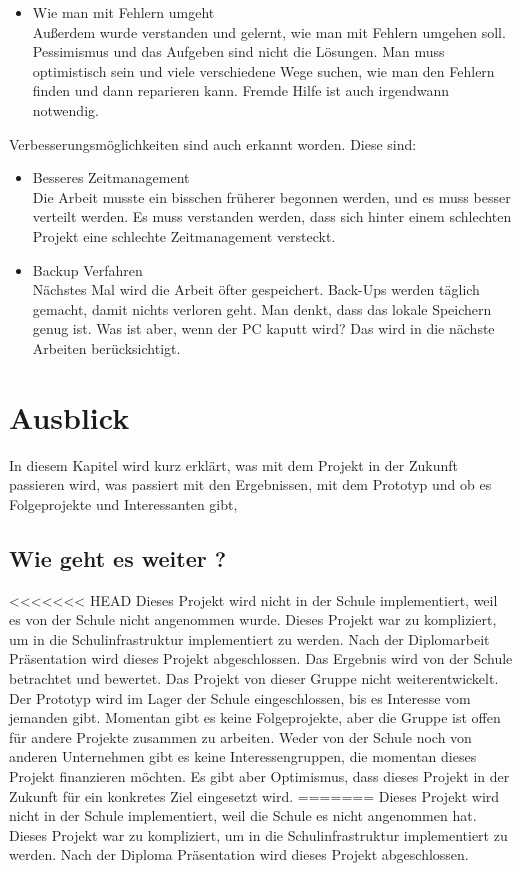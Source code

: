 \begin{itemize}
	\item Wie man mit Fehlern umgeht \\
	
	Außerdem wurde verstanden und gelernt, wie man mit Fehlern umgehen soll. Pessimismus und das Aufgeben sind nicht die Lösungen. Man muss optimistisch sein und viele verschiedene Wege suchen, wie man den Fehlern finden und dann reparieren kann. Fremde Hilfe ist auch irgendwann notwendig.
\end{itemize}	
	 Verbesserungsmöglichkeiten sind auch erkannt worden. Diese sind: 
\begin{itemize}	
	
	\item Besseres Zeitmanagement \\
	
	Die Arbeit musste ein bisschen früherer begonnen werden, und es muss besser verteilt werden. Es muss verstanden werden, dass sich hinter einem schlechten Projekt eine schlechte Zeitmanagement versteckt.
	
	\item Backup Verfahren \\
	
	Nächstes Mal wird die Arbeit öfter gespeichert. Back-Ups werden täglich gemacht, damit nichts verloren geht. Man denkt, dass das lokale Speichern genug ist. Was ist aber, wenn der PC kaputt wird? Das wird in die nächste Arbeiten berücksichtigt.
\end{itemize}

\chapter{Ausblick}
In diesem Kapitel wird kurz erkl\"art, was mit dem Projekt in der Zukunft passieren wird, was passiert mit den Ergebnissen, mit dem Prototyp und ob es Folgeprojekte und Interessanten gibt,
\section{Wie geht es weiter ?}
<<<<<<< HEAD
Dieses Projekt wird nicht in der Schule implementiert, weil es von der Schule nicht angenommen wurde. Dieses Projekt war zu kompliziert, um in die Schulinfrastruktur implementiert zu werden. Nach der Diplomarbeit Präsentation wird dieses Projekt abgeschlossen. Das Ergebnis wird von der Schule betrachtet und bewertet. Das Projekt von dieser Gruppe nicht weiterentwickelt. Der Prototyp wird im Lager der Schule eingeschlossen, bis es Interesse vom jemanden gibt. Momentan gibt es keine Folgeprojekte, aber die Gruppe ist offen für andere Projekte zusammen zu arbeiten. Weder von der Schule noch von anderen Unternehmen gibt es keine Interessengruppen, die momentan dieses Projekt finanzieren möchten. Es gibt aber Optimismus, dass dieses Projekt in der Zukunft für ein konkretes Ziel eingesetzt wird.
=======
Dieses Projekt wird nicht in der Schule implementiert, weil die Schule es nicht angenommen hat. Dieses Projekt war zu kompliziert, um in die Schulinfrastruktur implementiert zu werden. Nach der Diploma Präsentation wird dieses Projekt abgeschlossen.
